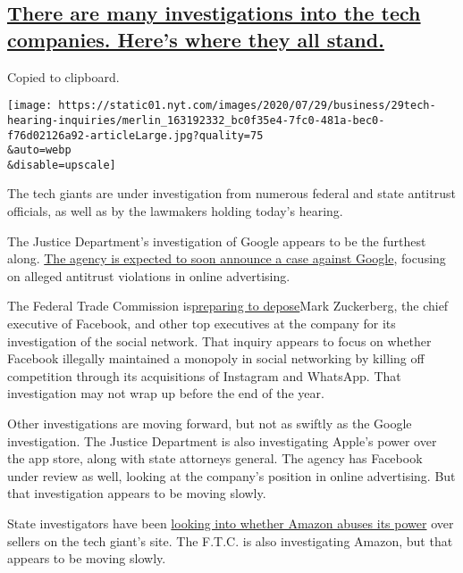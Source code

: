 \hypertarget{there-are-many-investigations-into-the-tech-companies-heres-where-they-all-stand}{%
\subsection{\texorpdfstring{\protect\hyperlink{there-are-many-investigations-into-the-tech-companies-heres-where-they-all-stand}{There
are many investigations into the tech companies. Here's where they all
stand.}}{There are many investigations into the tech companies. Here's where they all stand.}}\label{there-are-many-investigations-into-the-tech-companies-heres-where-they-all-stand}}

Copied to clipboard.

\texttt{[image: https://static01.nyt.com/images/2020/07/29/business/29tech-hearing-inquiries/merlin\_163192332\_bc0f35e4-7fc0-481a-bec0-f76d02126a92-articleLarge.jpg?quality=75\\\&auto=webp\\\&disable=upscale]}

The tech giants are under investigation from numerous federal and state
antitrust officials, as well as by the lawmakers holding today's
hearing.

The Justice Department's investigation of Google appears to be the
furthest along.
\href{https://www.nytimes.com/2020/06/25/technology/barr-google-investigation.html}{The
agency is expected to soon announce a case against Google}, focusing on
alleged antitrust violations in online advertising.

The Federal Trade Commission
is\href{https://www.nytimes.com/2020/07/17/technology/ftc-facebook-investigation.html}{preparing
to depose}Mark Zuckerberg, the chief executive of Facebook, and other
top executives at the company for its investigation of the social
network. That inquiry appears to focus on whether Facebook illegally
maintained a monopoly in social networking by killing off competition
through its acquisitions of Instagram and WhatsApp. That investigation
may not wrap up before the end of the year.

Other investigations are moving forward, but not as swiftly as the
Google investigation. The Justice Department is also investigating
Apple's power over the app store, along with state attorneys general.
The agency has Facebook under review as well, looking at the company's
position in online advertising. But that investigation appears to be
moving slowly.

State investigators have been
\href{https://www.nytimes.com/2020/06/12/technology/state-inquiry-antitrust-amazon.html}{looking
into whether Amazon abuses its power} over sellers on the tech giant's
site. The F.T.C. is also investigating Amazon, but that appears to be
moving slowly.

